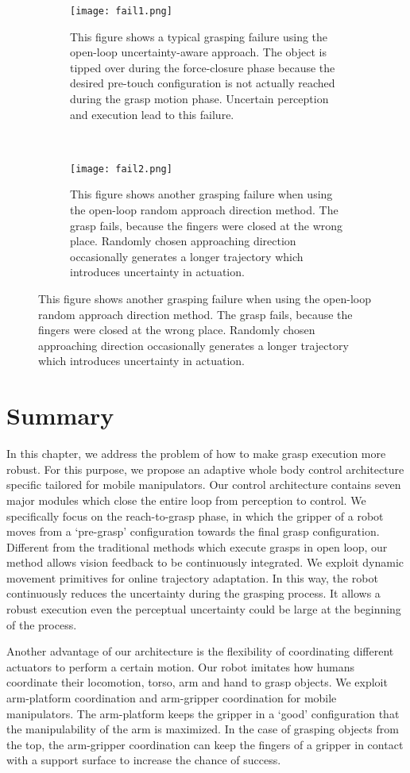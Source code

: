 \begin{figure}
    \centering
    \begin{subfigure}[t]{0.45\textwidth}
        \texttt{[image: fail1.png]}
        \caption{This figure shows a typical grasping failure using the open-loop uncertainty-aware approach. The object is tipped over during the force-closure phase because the desired pre-touch configuration is not actually reached during the grasp motion phase. Uncertain perception and execution lead to this failure.}
        \label{fig:failed_grasp_1}
    \end{subfigure}
    ~ %
    \begin{subfigure}[t]{0.45\textwidth}
        \texttt{[image: fail2.png]}
        \caption{This figure shows another grasping failure when using the open-loop random approach direction method. The grasp fails, because the fingers were closed at the wrong place. Randomly chosen approaching direction occasionally generates a longer trajectory which introduces uncertainty in actuation.}
        \label{fig:failed_grasp_2}
    \end{subfigure}    
\end{figure}

\section{Summary}
In this chapter, we address the problem of how to make grasp execution more robust. For this purpose, we propose an adaptive whole body control architecture specific tailored for mobile manipulators. Our control architecture contains seven major modules which close the entire loop from perception to control. We specifically focus on the reach-to-grasp phase, in which the gripper of a robot moves from a `pre-grasp' configuration towards the final grasp configuration. Different from the traditional methods which execute grasps in open loop, our method allows vision feedback to be continuously integrated. We exploit dynamic movement primitives for online trajectory adaptation. In this way, the robot continuously reduces the uncertainty during the grasping process. It allows a robust execution even the perceptual uncertainty could be large at the beginning of the process.   

Another advantage of our architecture is the flexibility of coordinating different actuators to perform a certain motion. Our robot imitates how humans coordinate their locomotion, torso, arm and hand to grasp objects. We exploit arm-platform coordination and arm-gripper coordination for mobile manipulators. The arm-platform keeps the gripper in a `good' configuration that the manipulability of the arm is maximized. In the case of grasping objects from the top, the arm-gripper coordination can keep the fingers of a gripper in contact with a support surface to increase the chance of success. 

